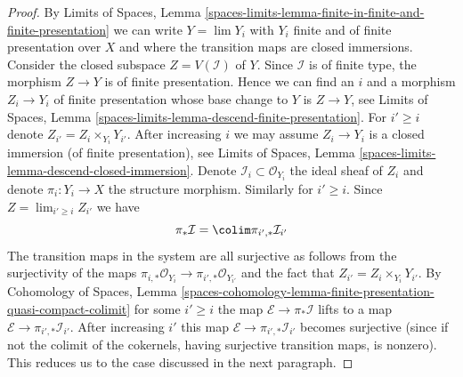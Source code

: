 \begin{proof}
\medskip\noindent
By Limits of Spaces, Lemma
\ref{spaces-limits-lemma-finite-in-finite-and-finite-presentation}
we can write $Y = \lim Y_i$ with $Y_i$ finite and of finite
presentation over $X$ and where the transition maps are closed
immersions. Consider the closed subspace $Z = V(\mathcal{I})$ of $Y$.
Since $\mathcal{I}$ is of finite type, the morphism $Z \to Y$ is of
finite presentation. Hence we can find an $i$ and a morphism
$Z_i \to Y_i$ of finite presentation whose base change to $Y$
is $Z \to Y$, see Limits of Spaces, Lemma
\ref{spaces-limits-lemma-descend-finite-presentation}.
For $i' \geq i$ denote $Z_{i'} = Z_i \times_{Y_i} Y_{i'}$.
After increasing $i$ we may assume $Z_i \to Y_i$ is a
closed immersion (of finite presentation), see Limits of Spaces, Lemma
\ref{spaces-limits-lemma-descend-closed-immersion}. Denote
$\mathcal{I}_i \subset \mathcal{O}_{Y_i}$ the ideal
sheaf of $Z_i$ and denote $\pi_i : Y_i \to X$ the structure morphism.
Similarly for $i' \geq i$. Since $Z = \lim_{i' \geq i} Z_{i'}$ we have
$$
\pi_*\mathcal{I} = \colim \pi_{i', *}\mathcal{I}_{i'}
$$
The transition maps in the system are all surjective
as follows from the surjectivity of the maps
$\pi_{i, *}\mathcal{O}_{Y_i} \to \pi_{i', *}\mathcal{O}_{Y_{i'}}$
and the fact that $Z_{i'} = Z_i \times_{Y_i} Y_{i'}$.
By Cohomology of Spaces, Lemma
\ref{spaces-cohomology-lemma-finite-presentation-quasi-compact-colimit}
for some $i' \geq i$ the map $\mathcal{E} \to \pi_*\mathcal{I}$
lifts to a map $\mathcal{E} \to \pi_{i', *}\mathcal{I}_{i'}$.
After increasing $i'$ this map
$\mathcal{E} \to \pi_{i', *}\mathcal{I}_{i'}$
becomes surjective (since if not the colimit of the cokernels,
having surjective transition maps, is nonzero).
This reduces us to the case discussed in the next paragraph.


\end{proof}
